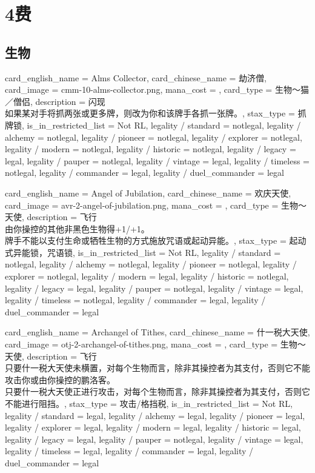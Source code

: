 \documentclass[lang = cn, color = black, 10pt]{AllThatStax}
\begin{document}
\chapter{4费}

\section{生物}

\card
{
	card_english_name = {Alms Collector},
	card_chinese_name = {劫济僧},
	card_image = cmm-10-alms-collector.png,
	mana_cost = ,
	card_type = 生物～猫／僧侣,
	description = {闪现\\
如果某对手将抓两张或更多牌，则改为你和该牌手各抓一张牌。},
	stax_type = 抓牌锁,
	is_in_restricted_list = Not RL,
	legality / standard = notlegal,
	legality / alchemy = notlegal,
	legality / pioneer = notlegal,
	legality / explorer = notlegal,
	legality / modern = notlegal,
	legality / historic = notlegal,
	legality / legacy = legal,
	legality / pauper = notlegal,
	legality / vintage = legal,
	legality / timeless = notlegal,
	legality / commander = legal,
	legality / duel_commander = legal
}

\card
{
	card_english_name = {Angel of Jubilation},
	card_chinese_name = {欢庆天使},
	card_image = avr-2-angel-of-jubilation.png,
	mana_cost = ,
	card_type = 生物～天使,
	description = {飞行\\
由你操控的其他非黑色生物得+1/+1。\\
牌手不能以支付生命或牺牲生物的方式施放咒语或起动异能。},
	stax_type = 起动式异能锁，咒语锁,
	is_in_restricted_list = Not RL,
	legality / standard = notlegal,
	legality / alchemy = notlegal,
	legality / pioneer = notlegal,
	legality / explorer = notlegal,
	legality / modern = legal,
	legality / historic = notlegal,
	legality / legacy = legal,
	legality / pauper = notlegal,
	legality / vintage = legal,
	legality / timeless = notlegal,
	legality / commander = legal,
	legality / duel_commander = legal
}

\card
{
	card_english_name = {Archangel of Tithes},
	card_chinese_name = {什一税大天使},
	card_image = otj-2-archangel-of-tithes.png,
	mana_cost = ,
	card_type = 生物～天使,
	description = {飞行\\
只要什一税大天使未横置，对每个生物而言，除非其操控者为其支付，否则它不能攻击你或由你操控的鹏洛客。\\
只要什一税大天使正进行攻击，对每个生物而言，除非其操控者为其支付，否则它不能进行阻挡。},
	stax_type = 攻击/格挡税,
	is_in_restricted_list = Not RL,
	legality / standard = legal,
	legality / alchemy = legal,
	legality / pioneer = legal,
	legality / explorer = legal,
	legality / modern = legal,
	legality / historic = legal,
	legality / legacy = legal,
	legality / pauper = notlegal,
	legality / vintage = legal,
	legality / timeless = legal,
	legality / commander = legal,
	legality / duel_commander = legal
}
\end{document}
